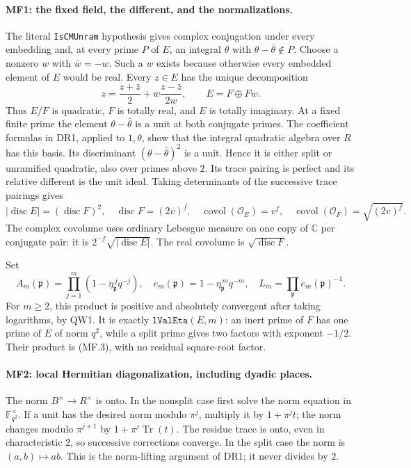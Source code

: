\paragraph{MF1: the fixed field, the different, and the normalizations.}
The literal \texttt{IsCMUnram} hypothesis gives complex conjugation
under every embedding and, at every prime \(P\) of \(E\), an integral
\(\theta\) with \(\theta-\bar\theta\notin P\).
Choose a nonzero \(w\) with \(\bar w=-w\). Such a \(w\) exists because
otherwise every embedded element of \(E\) would be real.
Every \(z\in E\) has the unique decomposition
\[
 z=\frac{z+\bar z}{2}
       +w\frac{z-\bar z}{2w},\qquad E=F\oplus Fw.       \tag{MF.1}
\]
Thus \(E/F\) is quadratic, \(F\) is totally real, and \(E\) is totally
imaginary. At a fixed finite prime the element
\(\theta-\bar\theta\) is a unit at both conjugate primes.
The coefficient formulas in DR1, applied to \(1,\theta\), show that
the integral quadratic algebra over \(R\) has this basis. Its
discriminant \((\theta-\bar\theta)^2\) is a unit. Hence it is either
split or unramified quadratic, also over primes above \(2\).
Its trace pairing is perfect and its relative different is the unit
ideal. Taking determinants of the successive trace pairings gives
\[
 |\operatorname{disc}E|=(\operatorname{disc}F)^2,\quad
 \operatorname{disc}F=(2v)^f,\quad
 \operatorname{covol}(\mathcal O_E)=v^f,\quad
 \operatorname{covol}(\mathcal O_F)=\sqrt{(2v)^f}.       \tag{MF.2}
\]
The complex covolume uses ordinary Lebesgue measure on one copy of
\(\mathbb C\) per conjugate pair: it is
\(2^{-f}\sqrt{|\operatorname{disc}E|}\). The real covolume is
\(\sqrt{\operatorname{disc}F}\).

Set
\[
 A_m(\mathfrak p)=\prod_{j=1}^{m}(1-\eta_{\mathfrak p}^{\,j}q^{-j}),
 \quad e_m(\mathfrak p)=1-\eta_{\mathfrak p}^{\,m}q^{-m},
 \quad L_m=\prod_{\mathfrak p}e_m(\mathfrak p)^{-1}.     \tag{MF.3}
\]
For \(m\ge2\), this product is positive and absolutely convergent
after taking logarithms, by QW1. It is exactly
\(\texttt{lValEta}(E,m)\): an inert prime of \(F\) has one prime of
\(E\) of norm \(q^2\), while a split prime gives two factors with
exponent \(-1/2\). Their product is (MF.3), with no residual
square-root factor.

\paragraph{MF2: local Hermitian diagonalization, including dyadic places.}
The norm \(B^\times\to R^\times\) is onto.
In the nonsplit case first solve the norm equation in
\(\mathbb F_{q^2}^\times\). If a unit has the desired norm modulo
\(\pi^j\), multiply it by \(1+\pi^j t\); the norm changes modulo
\(\pi^{j+1}\) by \(1+\pi^j\operatorname{Tr}(t)\).
The residue trace is onto, even in characteristic \(2\), so successive
corrections converge. In the split case the norm is \((a,b)\mapsto ab\).
This is the norm-lifting argument of DR1; it never divides by \(2\).

